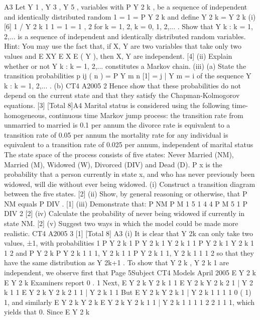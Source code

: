 \documentclass[a4paper,12pt]{article}
\begin{document}
\begin{enumerate}
A3
Let Y 1 , Y 3 , Y 5 ,
variables with
P Y 2 k
, be a sequence of independent and identically distributed random
1
= 1 = P Y 2 k
and define Y 2 k = Y 2 k
(i)
[6]
1 / Y 2 k 1
1
= 1 =
1
,
2
for k = 1, 2,
k = 0, 1, 2,...
.
Show that Y k : k = 1, 2,... is a sequence of independent and identically
distributed random variables.
Hint: You may use the fact that, if X, Y are two variables that take only two
values and E XY
E X E ( Y ), then X, Y are independent.
[4]
(ii) Explain whether or not Y k : k = 1, 2,... constitutes a Markov chain.
(iii) (a)
State the transition probabilities p ij ( n ) = P Y m
n
[1]
= j | Y m = i of the
sequence Y k : k = 1, 2,... .
(b)
CT4 A2005
2
Hence show that these probabilities do not depend on the current state
and that they satisfy the Chapman-Kolmogorov equations.
[3]
[Total 8]A4
Marital status is considered using the following time-homogeneous, continuous time
Markov jump process:
the transition rate from unmarried to married is 0.1 per annum
the divorce rate is equivalent to a transition rate of 0.05 per annum
the mortality rate for any individual is equivalent to a transition rate of 0.025 per
annum, independent of marital status
The state space of the process consists of five states: Never Married (NM),
Married (M), Widowed (W), Divorced (DIV) and Dead (D).
P x is the probability that a person currently in state x, and who has never previously
been widowed, will die without ever being widowed.
(i) Construct a transition diagram between the five states. [2]
(ii) Show, by general reasoning or otherwise, that P NM equals P DIV . [1]
(iii) Demonstrate that:
P NM
P M
1
5
1
4
4
P M
5
1
P DIV
2
[2]
(iv) Calculate the probability of never being widowed if currently in state NM. [2]
(v) Suggest two ways in which the model could be made more realistic.
CT4 A2005
3
[1]
[Total 8]
A3
(i)
It is clear that Y 2k can only take two values, ±1, with probabilities
1
P Y 2 k 1 P Y 2 k 1 Y 2 k 1
1 P Y 2 k 1 Y 2 k 1
1
2
and
P Y 2 k
P Y 2 k
1
1
1, Y 2 k
1
1
P Y 2 k
1
1, Y 2 k
1
1
1
2
so that they have the same distribution as Y 2k+1 .
To show that Y 2 k , Y 2 k
1
are independent, we observe first that
Page 5Subject CT4
Models
April 2005
E Y 2 k
E Y 2 k
Examiners report
0 .
1
Next,
E Y 2 k Y 2 k
1
1
E Y 2 k Y 2 k
2
1 | Y 2 k 1
1
E Y 2 k Y 2 k
2
1
1 | Y 2 k 1
1
But
E Y 2 k Y 2 k
1 | Y 2 k 1
1
1 1 0 ( 1) 1,
and similarly E Y 2 k Y 2 k
E Y 2 k Y 2 k
1
1 | Y 2 k 1
1
1
1
2
2
1
1
1, which yields that
0.
Since
E Y 2 k

\end{enumerate}
\end{document}
